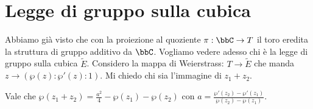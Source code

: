 
\section{Legge di gruppo sulla cubica}
Abbiamo già visto che con la proiezione al quoziente $\pi : \bbC \rightarrow T$ il toro eredita la struttura di gruppo additivo da $\bbC$.
Vogliamo vedere adesso chi è la legge di gruppo sulla cubica $\widetilde{E}$.
Considero la mappa di Weierstrass: $T\rightarrow \widetilde{E}$ che manda $z \rightarrow (\wp(z):\wp'(z):1)$. Mi chiedo chi sia l'immagine di $z_1 + z_2$.

\begin{teorema}
  \label{leggedigruppo}
  Vale che $\wp(z_1+z_2) = \frac{a^2}{4} - \wp(z_1) - \wp(z_2) $
  con $a = \frac{\wp'(z_2) - \wp'(z_1)}{\wp(z_2) - \wp(z_1)}$.
\end{teorema}

